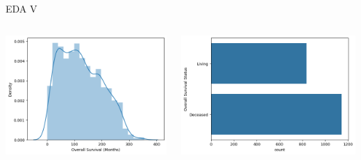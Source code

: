 \documentclass{beamer}
\begin{document}
\begin{frame}{EDA V}
\begin{columns}
    \begin{column}{0.49 \textwidth}
        \centering
        \includegraphics[width = \textwidth]{images/surv_m.png}
    \end{column}
    \begin{column}{0.49 \textwidth}
        \centering
        \includegraphics[width = \textwidth]{images/surv_s.png}
    \end{column}
\end{columns}
\end{frame}
\end{document}
